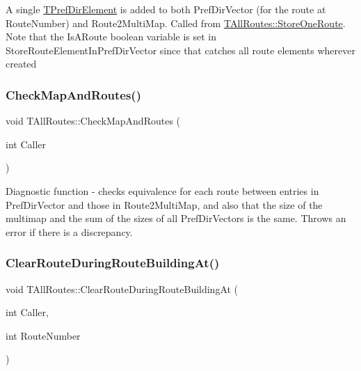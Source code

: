 A single \mbox{\hyperlink{class_t_pref_dir_element}{T\+Pref\+Dir\+Element}} is added to both Pref\+Dir\+Vector (for the route at Route\+Number) and Route2\+Multi\+Map. Called from \mbox{\hyperlink{class_t_all_routes_af70c07d73f0b62ed85bbebc5451d009c}{T\+All\+Routes\+::\+Store\+One\+Route}}. Note that the Is\+A\+Route boolean variable is set in Store\+Route\+Element\+In\+Pref\+Dir\+Vector since that catches all route elements wherever created \mbox{\label{class_t_all_routes_a54e5483e7b01daf50436e3dcc8794e77}} 
\subsubsection{\texorpdfstring{Check\+Map\+And\+Routes()}{CheckMapAndRoutes()}}
{\footnotesize\ttfamily void T\+All\+Routes\+::\+Check\+Map\+And\+Routes (\begin{DoxyParamCaption}\item[{int}]{Caller }\end{DoxyParamCaption})}

Diagnostic function -\/ checks equivalence for each route between entries in Pref\+Dir\+Vector and those in Route2\+Multi\+Map, and also that the size of the multimap and the sum of the sizes of all Pref\+Dir\+Vectors is the same. Throws an error if there is a discrepancy. \mbox{\label{class_t_all_routes_ab23a53bd95aeb951108a004735b9a45e}} 
\subsubsection{\texorpdfstring{Clear\+Route\+During\+Route\+Building\+At()}{ClearRouteDuringRouteBuildingAt()}}
{\footnotesize\ttfamily void T\+All\+Routes\+::\+Clear\+Route\+During\+Route\+Building\+At (\begin{DoxyParamCaption}\item[{int}]{Caller,  }\item[{int}]{Route\+Number }\end{DoxyParamCaption})}


